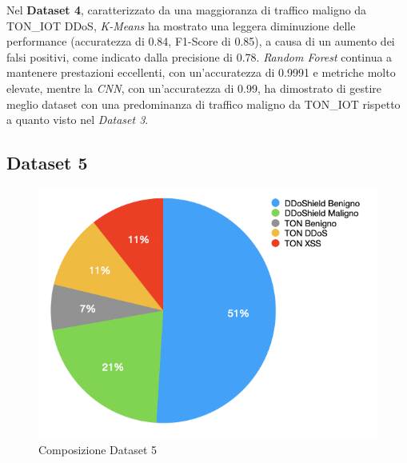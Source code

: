 \begin{table}[htbp]
\centering
\renewcommand{\arraystretch}{1.5} %
\caption{Metriche di performance per Dataset 4}
\label{tab:performance_metrics}
\end{table}

Nel \textbf{Dataset 4}, caratterizzato da una maggioranza di traffico maligno da TON\_IOT DDoS, \textit{K-Means} ha mostrato una leggera diminuzione delle performance (accuratezza di 0.84, F1-Score di 0.85), a causa di un aumento dei falsi positivi, come indicato dalla precisione di 0.78.
\textit{Random Forest} continua a mantenere prestazioni eccellenti, con un'accuratezza di 0.9991 e metriche molto elevate, mentre la \textit{CNN}, con un'accuratezza di 0.99, ha dimostrato di gestire meglio dataset con una predominanza di traffico maligno da TON\_IOT rispetto a quanto visto nel \textit{Dataset 3}.

\subsection{Dataset 5}

\begin{figure}[htbp]
\centering
\includegraphics[scale= 0.8]{UNINA_MSc_Thesis_Project/img/chapterRisulati/composizione_DATASET_5.png}
  \caption{Composizione Dataset 5}
\end{figure}

